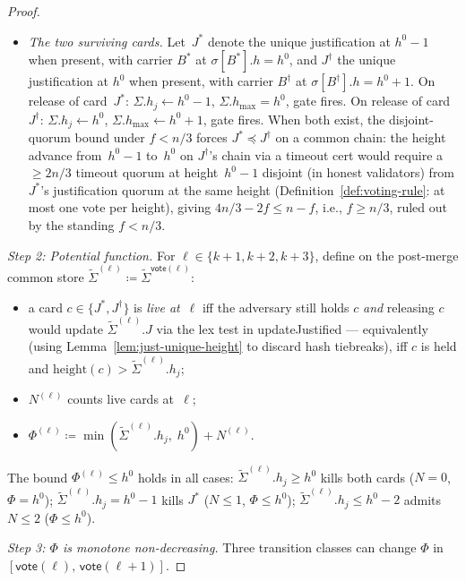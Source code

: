 \ifx\litemode\undefined\documentclass{article}\fi
\newcommand{\hmax}{\ensuremath{h_{\max}}\xspace}
\newcommand{\vote}{\ensuremath{\mathsf{vote}}}
\newcommand{\comm}[1]{\ensuremath{\widetilde{#1}}}
\newcommand{\updateJustified}{\textsf{updateJustified}\xspace}
\theoremstyle{plain}
\theoremstyle{definition}
\theoremstyle{remark}
\begin{document}
\begin{proof}
\begin{itemize}
  \item\emph{The two surviving cards.}
  Let~$J^*$ denote the unique justification at $h^0 - 1$ when present, with carrier $B^*$ at $\sigma[B^*].h = h^0$, and $J^\dagger$ the unique justification at $h^0$ when present, with carrier $B^\dagger$ at $\sigma[B^\dagger].h = h^0 + 1$.
  On release of card~$J^*$: $\Sigma.h_j \gets h^0 - 1$, $\Sigma.\hmax = h^0$, gate fires.
  On release of card~$J^\dagger$: $\Sigma.h_j \gets h^0$, $\Sigma.\hmax \gets h^0 + 1$, gate fires.
  When both exist, the disjoint-quorum bound under $f < n/3$ forces $J^* \preceq J^\dagger$ on a common chain: the height advance from~$h^0 - 1$ to~$h^0$ on $J^\dagger$'s chain via a timeout cert would require a $\geq 2n/3$ timeout quorum at height~$h^0 - 1$ disjoint (in honest validators) from $J^*$'s justification quorum at the same height (Definition~\ref{def:voting-rule}: at most one vote per height), giving $4n/3 - 2f \leq n - f$, i.e., $f \geq n/3$, ruled out by the standing $f < n/3$.
\end{itemize}

\emph{Step 2: Potential function.}
For $\ell \in \{k+1, k+2, k+3\}$, define on the post-merge common store $\comm{\Sigma}^{(\ell)} \coloneqq \comm{\Sigma}^{\vote(\ell)}$:
\begin{itemize}
  \item a card $c \in \{J^*, J^\dagger\}$ is \emph{live at}~$\ell$ iff the adversary still holds $c$ \emph{and} releasing $c$ would update $\comm{\Sigma}^{(\ell)}.J$ via the lex test in \updateJustified{} --- equivalently (using Lemma~\ref{lem:just-unique-height} to discard hash tiebreaks), iff $c$ is held and $\mathrm{height}(c) > \comm{\Sigma}^{(\ell)}.h_j$;
  \item $N^{(\ell)}$ counts live cards at~$\ell$;
  \item $\Phi^{(\ell)} \coloneqq \min(\comm{\Sigma}^{(\ell)}.h_j,\; h^0) + N^{(\ell)}$.
\end{itemize}

The bound $\Phi^{(\ell)} \leq h^0$ holds in all cases:
$\comm{\Sigma}^{(\ell)}.h_j \geq h^0$ kills both cards ($N = 0$, $\Phi = h^0$); $\comm{\Sigma}^{(\ell)}.h_j = h^0 - 1$ kills $J^*$ ($N \leq 1$, $\Phi \leq h^0$); $\comm{\Sigma}^{(\ell)}.h_j \leq h^0 - 2$ admits $N \leq 2$ ($\Phi \leq h^0$).

\emph{Step 3: $\Phi$ is monotone non-decreasing.}
Three transition classes can change $\Phi$ in $[\vote(\ell),\, \vote(\ell+1)]$.


\end{proof}
\end{document}
